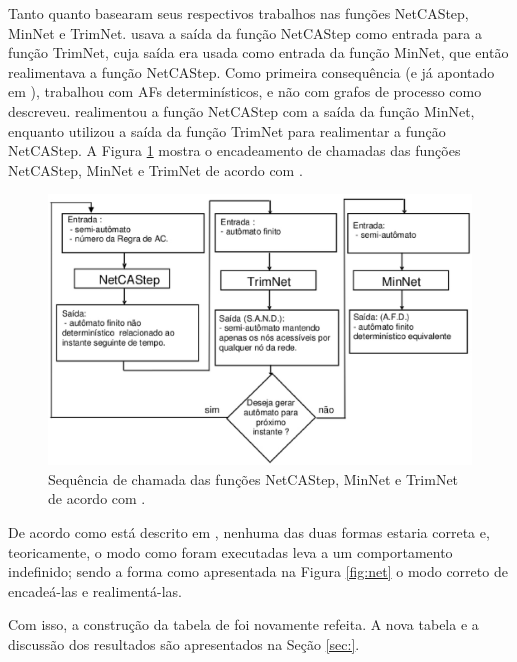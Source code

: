 \documentclass[12pt,a4paper]{article}
\begin{document}
Tanto  quanto  basearam seus
respectivos trabalhos nas funções NetCAStep, MinNet e TrimNet.
 usava a saída da função NetCAStep como entrada
para a função TrimNet, cuja saída era usada como entrada da função
MinNet, que então realimentava a função NetCAStep. Como primeira
consequência (e já apontado em ),
 trabalhou com AFs determinísticos, e não com
grafos de processo como descreveu.  realimentou
a função NetCAStep com a saída da função MinNet, enquanto
 utilizou a saída da função TrimNet para realimentar
a função NetCAStep. A Figura \ref{fig:net-miki} mostra o encadeamento de
chamadas das funções NetCAStep, MinNet e TrimNet de acordo com
.

\begin{figure}[htp]
\begin{center}
\includegraphics[scale=0.5]{img/net-miki.eps}
\caption{Sequência de chamada das funções NetCAStep, MinNet e TrimNet de
acordo com .}
\label{fig:net-miki}
\end{center}
\end{figure}

De acordo como está descrito em
, nenhuma das duas formas estaria correta e,
teoricamente, o modo como foram executadas leva a um comportamento indefinido;
sendo a forma como apresentada na Figura \ref{fig:net} o modo correto de
encadeá-las e realimentá-las.

Com isso, a construção da tabela de  foi novamente
refeita. A nova tabela e a discussão dos resultados são apresentados na
Seção \ref{sec:}.
\end{document}

